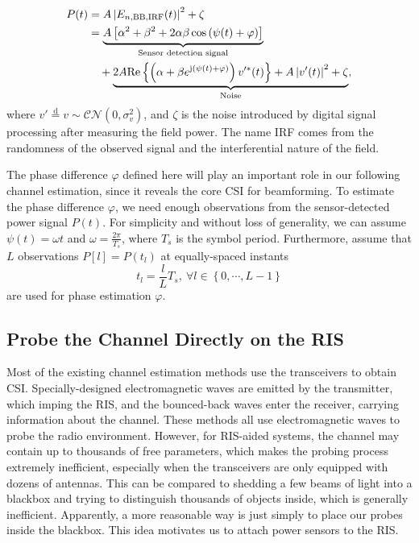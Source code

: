 \documentclass[12pt,draftclsnofoot,journal,onecolumn]{IEEEtran}
\theoremstyle{nonumberplain}
\begin{document}
    \begin{equation}
        \label{eqn:power of interference}
        \begin{aligned}
            P(t)&=A \left| E_{n, {\rm BB, IRF}} (t)\right |^{2}+\zeta\\
            &=\underbrace{A\left[\alpha^{2}+\beta^{2}+2\alpha\beta\cos\left(\psi(t)+\varphi\right)\right]}_{\text{Sensor detection signal}}\\
            &~~~+\underbrace{2A\text{Re}\left\{\left(\alpha+\beta e^{{\rm j}\left(\psi(t)+\varphi\right)}\right)v'^{*}(t)\right\}+A\left|v'(t)\right|^{2}+\zeta}_{\text{Noise}},\\
        \end{aligned}
    \end{equation}
    where $v'\overset{\text{d}}{=}v\sim\mathcal{CN}\left(0,\sigma_{v}^{2}\right)$, and $\zeta$ is the noise introduced by digital signal processing after measuring the field power. 
    The name IRF comes from the randomness of the observed signal and the interferential nature of the field.

    The phase difference $\varphi$ defined here will play an important role in our following channel estimation, since it reveals the core CSI for beamforming. To estimate the phase difference $\varphi$, we need enough observations from the sensor-detected power signal $P(t)$. For simplicity and without loss of generality, we can assume $\psi(t)=\omega t$ and $\omega=\frac{2\pi}{T_{s}}$, where $T_s$ is the symbol period. Furthermore, assume that $L$ observations $P[l]=P(t_{l})$ at equally-spaced instants 
    \begin{equation}
        \label{observation time}
        t_{l}=\frac{l}{L}T_{s},~\forall l\in \left\{0,\cdots ,L-1\right\}
    \end{equation}
    are used for phase estimation $\varphi$.

\subsection{Probe the Channel Directly on the RIS}
    Most of the existing channel estimation methods use the transceivers to obtain  CSI. 
    Specially-designed electromagnetic waves are emitted by the transmitter, which imping the RIS, and the bounced-back waves enter the receiver, carrying information about the channel. 
    These methods all use electromagnetic waves to probe the radio environment. 
    However, for RIS-aided systems, the channel may contain up to thousands of free parameters, which makes the probing process extremely inefficient, especially when the transceivers are only equipped with dozens of antennas. This can be compared to shedding a few beams of light into a blackbox and trying to distinguish thousands of objects inside, which is generally inefficient. Apparently, a more reasonable way is just simply to place our probes inside the blackbox. This idea motivates us to attach power sensors to the RIS. 
\end{document}
